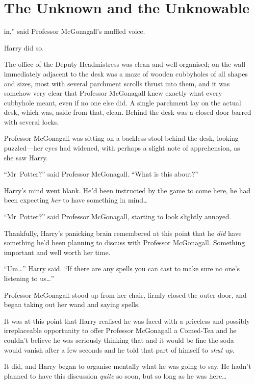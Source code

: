 \chapter{The Unknown and the Unknowable}

 in,” said Professor McGonagall’s muffled voice.

\hplettrineextrapara
Harry did so.

The office of the Deputy Headmistress was clean and well-organised; on the wall immediately adjacent to the desk was a maze of wooden cubbyholes of all shapes and sizes, most with several parchment scrolls thrust into them, and it was somehow very clear that Professor McGonagall knew exactly what every cubbyhole meant, even if no one else did. A single parchment lay on the actual desk, which was, aside from that, clean. Behind the desk was a closed door barred with several locks.

Professor McGonagall was sitting on a backless stool behind the desk, looking puzzled—her eyes had widened, with perhaps a slight note of apprehension, as she saw Harry.

“Mr~Potter?” said Professor McGonagall. “What is this about?”

Harry’s mind went blank. He’d been instructed by the game to come here, he had been expecting \emph{her} to have something in mind…

“Mr~Potter?” said Professor McGonagall, starting to look slightly annoyed.

Thankfully, Harry’s panicking brain remembered at this point that he \emph{did} have something he’d been planning to discuss with Professor McGonagall. Something important and well worth her time.

“Um…” Harry said. “If there are any spells you can cast to make sure no one’s listening to us…”

Professor McGonagall stood up from her chair, firmly closed the outer door, and began taking out her wand and saying spells.

It was at this point that Harry realised he was faced with a priceless and possibly irreplaceable opportunity to offer Professor McGonagall a Comed-Tea and he couldn’t believe he was seriously thinking that and it would be fine the soda would vanish after a few seconds and he told that part of himself to \emph{shut up.}

It did, and Harry began to organise mentally what he was going to say. He hadn’t planned to have this discussion \emph{quite} so soon, but so long as he was here…

